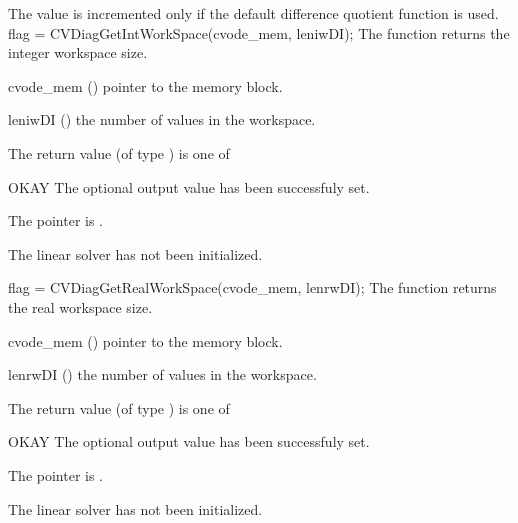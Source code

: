 {
  The value  is incremented only if the default 
   difference quotient function is used.
}
%
%
{
  flag = CVDiagGetIntWorkSpace(cvode\_mem, leniwDI);
}
{
  The function  returns the
  {\cvdiag} integer workspace size.
}
{
  \begin{args}
  \item[cvode\_mem] ()
    pointer to the {\cvode} memory block.
  \item[leniwDI] ()
    the number of  values in the {\cvdiag} workspace.
  \end{args}
}
{
  The return value  (of type ) is one of
  \begin{args}
  \item[OKAY] 
    The optional output value has been successfuly set.
  \item[\Id{LIN\_NO\_MEM}]
    The  pointer is .
  \item[\Id{LIN\_NO\_LMEM}]
    The {\cvdiag} linear solver has not been initialized.
  \end{args}
}
{}
{
  flag = CVDiagGetRealWorkSpace(cvode\_mem, lenrwDI);
}
{
  The function  returns the
  {\cvdiag} real workspace size.
}
{
  \begin{args}
  \item[cvode\_mem] ()
    pointer to the {\cvode} memory block.
  \item[lenrwDI] ()
    the number of  values in the {\cvdiag} workspace.
  \end{args}
}
{
  The return value  (of type ) is one of
  \begin{args}
  \item[OKAY] 
    The optional output value has been successfuly set.
  \item[\Id{LIN\_NO\_MEM}]
    The  pointer is .
  \item[\Id{LIN\_NO\_LMEM}]
    The {\cvdiag} linear solver has not been initialized.
  \end{args}
}
